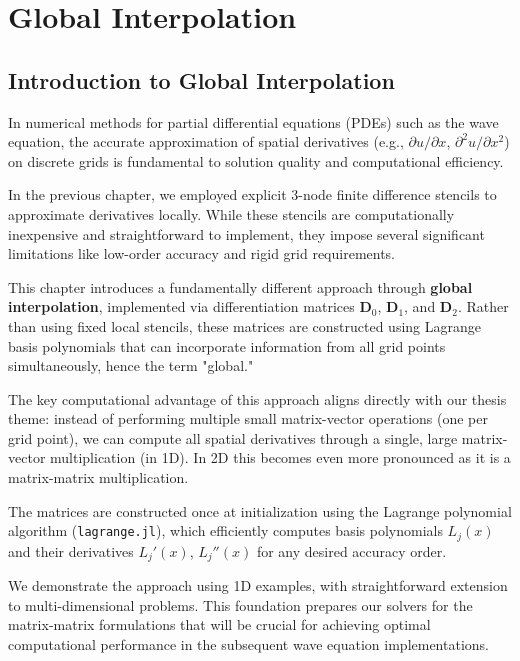 
\chapter{Global Interpolation}
\label{ch::chapter7}

\vspace{-1cm}

\section{Introduction to Global Interpolation}

In numerical methods for partial differential equations (PDEs) such as the wave equation, the accurate approximation of spatial derivatives (e.g., \(\partial u/\partial x\), \(\partial^2 u/\partial x^2\)) on discrete grids is fundamental to solution quality and computational efficiency.

In the previous chapter, we employed explicit 3-node finite difference stencils to approximate derivatives locally. While these stencils are computationally inexpensive and straightforward to implement, they impose several significant limitations like low-order accuracy and rigid grid requirements.

This chapter introduces a fundamentally different approach through \textbf{global interpolation}, implemented via differentiation matrices \(\mathbf{D}_0\), \(\mathbf{D}_1\), and \(\mathbf{D}_2\). Rather than using fixed local stencils, these matrices are constructed using Lagrange basis polynomials that can incorporate information from all grid points simultaneously, hence the term "global."

The key computational advantage of this approach aligns directly with our thesis theme: instead of performing multiple small matrix-vector operations (one per grid point), we can compute all spatial derivatives through a single, large matrix-vector multiplication (in 1D). In 2D this becomes even more pronounced as it is a matrix-matrix multiplication.

The matrices are constructed once at initialization using the Lagrange polynomial algorithm (\texttt{lagrange.jl}), which efficiently computes basis polynomials \(L_j(x)\) and their derivatives \(L_j'(x)\), \(L_j''(x)\) for any desired accuracy order.

We demonstrate the approach using 1D examples, with straightforward extension to multi-dimensional problems. This foundation prepares our solvers for the matrix-matrix formulations that will be crucial for achieving optimal computational performance in the subsequent wave equation implementations.

